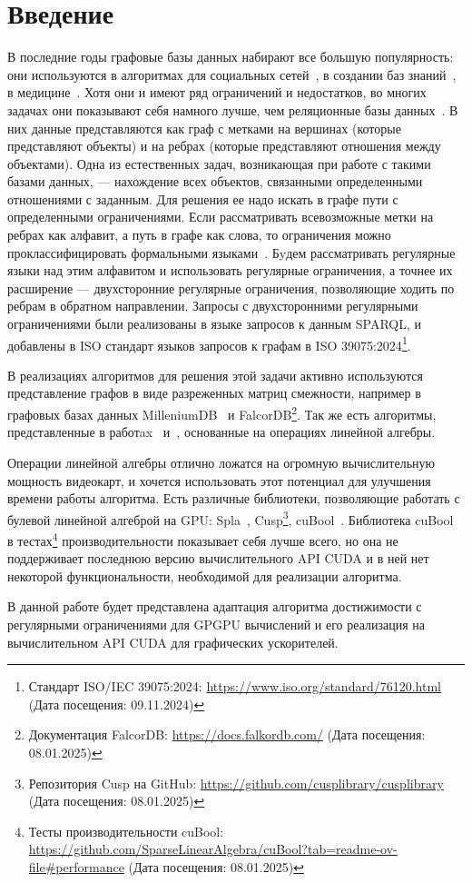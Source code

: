 
\section*{Введение}
\thispagestyle{withCompileDate}

В последние годы графовые базы данных набирают все большую популярность:
они используются в алгоритмах для социальных сетей~\cite{SocNets}, в создании баз 
знаний~\cite{Knowledge}, в медицине~\cite{ChemRecEngine}. Хотя они и имеют ряд ограничений
и недостатков, во многих задачах они показывают себя намного лучше, чем реляционные базы
данных~\cite{GraphDatabases}.
В них данные представляются как граф с метками на вершинах (которые представляют объекты)
и на ребрах (которые представляют отношения между объектами). Одна из естественных задач,
возникающая при работе с такими базами данных, --- нахождение всех объектов, связанными
определенными отношениями с заданным. Для решения ее надо искать в графе пути с
определенными ограничениями. Если рассматривать всевозможные метки на ребрах как алфавит,
а путь в графе как слова, то ограничения можно проклассифицировать формальными языками~\cite{FormPathReg}.
Бyдем рассматривать регулярные языки над этим алфавитом и использовать регулярные ограничения,
а точнее их расширение –-- двухсторонние регулярные ограничения, позволяющие
ходить по ребрам в обратном направлении. Запросы с двухсторонними регулярными
ограничениями были реализованы в языке запросов
к данным SPARQL, и добавлены в ISO стандарт языков запросов к графам в ISO 
39075:2024\footnote{Стандарт ISO/IEC 39075:2024: \url{https://www.iso.org/standard/76120.html} (Дата посещения: 09.11.2024)}.

В реализациях алгоритмов для решения этой задачи активно используются представление графов в
виде разреженных матриц смежности, например в графовых базах данных MilleniumDB~\cite{MilleniumDB} и FalcorDB\footnote{Документация FalcorDB: \url{https://docs.falkordb.com/} (Дата посещения: 08.01.2025)}. 
Так же есть алгоритмы, представленные в работax~\cite{sparse-rpq-1} и~\cite{OldRpqVkr}, основанные на операциях линейной алгебры.

Операции линейной алгебры отлично ложатся на огромную вычислительную мощность видеокарт,
и хочется использовать этот потенциал для улучшения времени работы алгоритма. Есть
различные библиотеки, позволяющие работать с булевой линейной алгеброй на 
GPU: Spla~\cite{Spla}, Cusp\footnote{Репозитория Cusp на GitHub: \url{https://github.com/cusplibrary/cusplibrary} (Дата посещения: 08.01.2025)}, cuBool~\cite{CuBool}.
Библиотека cuBool~\cite{CuBool} в тестах\footnote{Тесты производительности cuBool: \url{
https://github.com/SparseLinearAlgebra/cuBool?tab=readme-ov-file\#performance} (Дата посещения: 08.01.2025)}
производительности показывает себя лучше всего, но она не поддерживает последнюю
версию вычислительного API CUDA и в ней нет некоторой функциональности,
необходимой для реализации алгоритма.

В данной работе будет представлена адаптация алгоритма достижимости с регулярными 
ограничениями для GPGPU вычислений и его 
реализация на вычислительном API CUDA для графических ускорителей.
